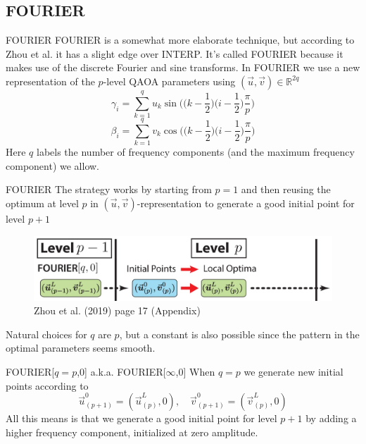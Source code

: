\documentclass{beamer}
\begin{document}
\subsection{FOURIER}
\begin{frame}{FOURIER}
	FOURIER is a somewhat more elaborate technique, but according to Zhou et al. it has a slight edge over INTERP. It's called FOURIER because it makes use of the discrete Fourier and sine transforms. In FOURIER we use a new representation of the $p$-level QAOA parameters using $(\vec{u},\vec{v})\in \mathbb{R}^{2q}$
	\begin{equation}
		\gamma_i = \sum_{k=1}^q u_k \sin \bigg(\Big(k-\frac{1}{2}\Big)\Big(i-\frac{1}{2}\Big)\frac{\pi}{p}\bigg)
	\end{equation}
	\begin{equation}
	\beta_i = \sum_{k=1}^q v_k \cos \bigg(\Big(k-\frac{1}{2}\Big)\Big(i-\frac{1}{2}\Big)\frac{\pi}{p}\bigg)
	\end{equation}
	Here $q$ labels the number of frequency components (and the maximum frequency component) we allow. %
\end{frame}

\begin{frame}{FOURIER}
	The strategy works by starting from $p=1$ and then reusing the optimum at level $p$ in $(\vec{u},\vec{v})$-representation to generate a good initial point for level $p+1$
	
	\begin{figure}
		\centering
		\includegraphics[scale=0.3]{figures/fourier[q,0].JPG}
		\caption{Zhou et al. (2019) page 17 (Appendix)}
	\end{figure}	
	
	Natural choices for $q$ are $p$, but a constant is also possible since the pattern in the optimal parameters seems smooth.
\end{frame}

\begin{frame}{FOURIER[$q=p$,0] a.k.a. FOURIER[$\infty$,0]}
	When $q=p$ we generate new initial points according to
	\begin{equation}
		\vec{u}_{(p+1)}^0 = (\vec{u}_{(p)}^L,0), \quad \vec{v}_{(p+1)}^0 = (\vec{v}_{(p)}^L,0)
	\end{equation}
	All this means is that we generate a good initial point for level $p+1$ by adding a higher frequency component, initialized at zero amplitude.
\end{frame}
\end{document}
